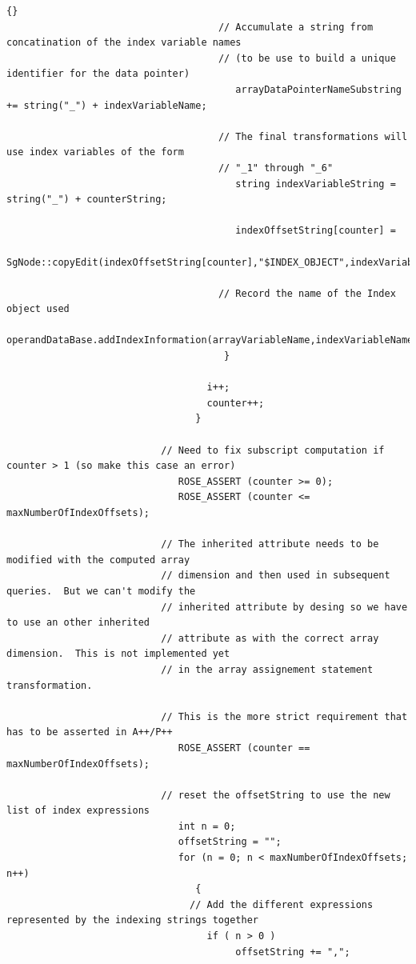 \documentclass[10pt]{article}
\begin{document}
{\begin{lstlisting}{}
                                     // Accumulate a string from concatination of the index variable names
                                     // (to be use to build a unique identifier for the data pointer)
                                        arrayDataPointerNameSubstring += string("_") + indexVariableName;

                                     // The final transformations will use index variables of the form
                                     // "_1" through "_6"
                                        string indexVariableString = string("_") + counterString;

                                        indexOffsetString[counter] =
                                             SgNode::copyEdit(indexOffsetString[counter],"$INDEX_OBJECT",indexVariableString);

                                     // Record the name of the Index object used
                                        operandDataBase.addIndexInformation(arrayVariableName,indexVariableName);
                                      }

                                   i++;
                                   counter++;
                                 }

                           // Need to fix subscript computation if counter > 1 (so make this case an error)
                              ROSE_ASSERT (counter >= 0);
                              ROSE_ASSERT (counter <= maxNumberOfIndexOffsets);

                           // The inherited attribute needs to be modified with the computed array
                           // dimension and then used in subsequent queries.  But we can't modify the
                           // inherited attribute by desing so we have to use an other inherited
                           // attribute as with the correct array dimension.  This is not implemented yet
                           // in the array assignement statement transformation.

                           // This is the more strict requirement that has to be asserted in A++/P++
                              ROSE_ASSERT (counter == maxNumberOfIndexOffsets);

                           // reset the offsetString to use the new list of index expressions
                              int n = 0;
                              offsetString = "";
                              for (n = 0; n < maxNumberOfIndexOffsets; n++)
                                 {
                                // Add the different expressions represented by the indexing strings together
                                   if ( n > 0 )
                                        offsetString += ",";


\end{lstlisting}}
\end{document}
